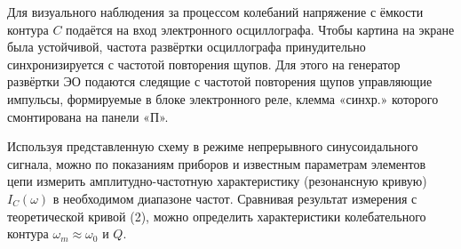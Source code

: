 \documentclass[12pt,a4paper]{article}
\begin{document}
Для визуального наблюдения за процессом колебаний напряжение с ёмкости контура \( C \) подаётся на вход электронного осциллографа. Чтобы картина на экране была устойчивой, частота развёртки осциллографа принудительно синхронизируется с частотой повторения щупов. Для этого на генератор развёртки ЭО подаются следящие с частотой повторения щупов управляющие импульсы, формируемые в блоке электронного реле, клемма «синхр.» которого смонтирована на панели «П».

Используя представленную схему в режиме непрерывного синусоидального сигнала, можно по показаниям приборов и известным параметрам элементов цепи измерить амплитудно-частотную характеристику (резонансную кривую) \( I_C(\omega) \) в необходимом диапазоне частот. Сравнивая результат измерения с теоретической кривой (2), можно определить характеристики колебательного контура \( \omega_m \approx \omega_0 \) и \( Q \).
\end{document}
